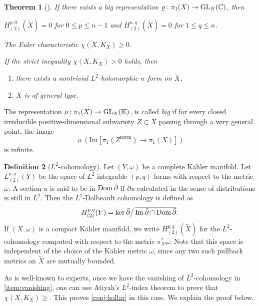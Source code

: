 \documentclass[english]{amsproc}
\theoremstyle{plain}
\newtheorem{thm}{Theorem}[section]
\theoremstyle{definition}
\newtheorem{dfn}[thm]{Definition}
\theoremstyle{remark}
\theoremstyle{plain}
\numberwithin{equation}{thm} %
\newcommand{\bC}{\mathbb{C}}
\def\db{\bar{\partial}}
\newcommand{\GL}{{\rm GL}}
\begin{document}
	
	\begin{thm}[\cite{DW24b}]\label{main:kollar}
		If there exists a big representation $\varrho:\pi_1(X)\to\GL_N(\bC)$, then 
		\begin{thmlist} 
			\item  \label{item:vanishing} $H^{p,0}_{(2)}(\widetilde{X})=0$   for  $0\leq p\leq n-1$ and $H^{n,q}_{(2)}(\widetilde{X})=0$ for  $1\leq q\leq n$. 
			\item \label{item:Euler}The Euler characteristic $\chi(X, K_X)\geq 0$.
			\item  \label{item:strict} If the strict inequality $\chi(X,K_X)>0$ holds, then 
			\begin{enumerate}[label*=(\alph*)]
				\item \label{item:converse2}there exists  {a nontrivial} $L^2$-holomorphic $n$-form on $\widetilde{X}$;
				\item  \label{item:converse} $X$ is of general type. 
			\end{enumerate}  
		\end{thmlist} 
	\end{thm}
	The representation $\varrho:\pi_1(X)\to \GL_N(\mathbb{K})$, is called \emph{big} if  for every closed irreducible positive-dimensional subvariety $Z \subset X$ passing through a very general point, the image
	\[
	\varrho(\mathrm{Im} [\pi_1(Z^{\mathrm{norm}}) \longrightarrow \pi_1(X)])
	\]
	is infinite.
	\begin{dfn}[$L^2$-cohomology]\label{defn:L2} 
		Let $(Y,\omega)$ be a complete K\"ahler manifold.  Let   $L_{(2)}^{p,q}(Y)$  be the space of $L^2$-integrable   $(p,q)$-forms with respect to the metric $\omega$. A section $u$ is said to be in  ${\rm Dom}\, \db$  if  $\db u$  calculated in the sense of distributions is still in $L^2$.  Then  the $L^2$-Dolbeault cohomology is defined as
		\[ H^{p,q}_{(2)}(Y)= {{\rm ker}\, \db}\big/\,{\overline{{\rm Im}\, \db \cap {\rm Dom}\, \db}}.
		\]  
If $(X,\omega)$ is a compact K\"ahler manifold, we write $H^{p,q}_{(2)}(\widetilde{X})$ for the $L^2$-cohomology computed with respect to the metric $\pi_X^*\omega$. 
Note that this space is independent of the choice of the K\"ahler metric $\omega$, since any two such pullback metrics on $\widetilde{X}$ are mutually bounded. 
	\end{dfn}  
As is well-known to experts, once we have the vanishing of $L^2$-cohomology in \cref{item:vanishing}, one can use  Atiyah's $ {L^2}$-index theorem to prove that $\chi(X, K_X)\geq $. This proves \cref{conj:kollar} in this case.  We explain the proof below, 
\end{document}
